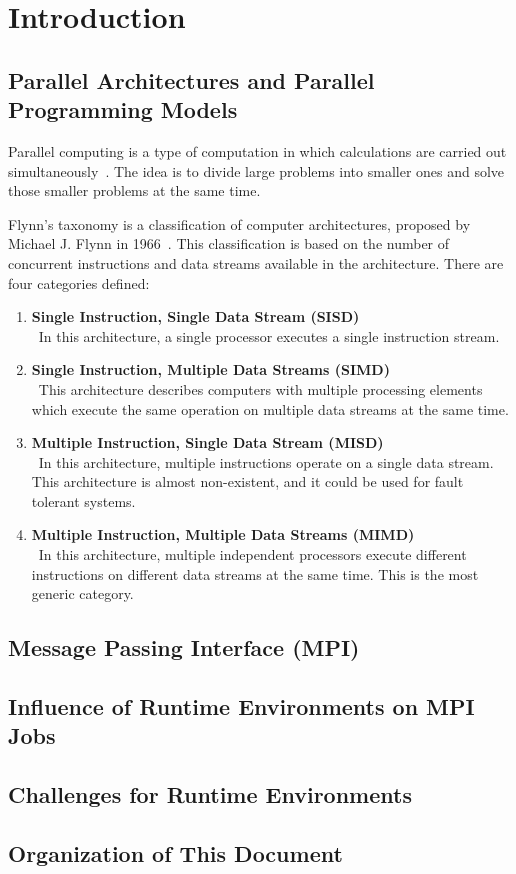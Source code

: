 \chapter{Introduction}
\label{sec:Introduction}

\section{Parallel Architectures and Parallel Programming Models}
\label{sec:Introduction}

Parallel computing is a type of computation in which calculations are carried out simultaneously~\cite{Almasi:1989:HPC:160438}. The idea is to divide large problems into smaller ones and solve those smaller problems at the same time.

Flynn's taxonomy is a classification of computer architectures, proposed by Michael J. Flynn in 1966~\cite{5009071,44900}. This classification is based on the number of concurrent instructions and data streams available in the architecture.
There are four categories defined:

\begin{enumerate}
  \item \textbf{Single Instruction, Single Data Stream (SISD)}\\\
In this architecture, a single processor executes a single instruction stream.

  \item \textbf{Single Instruction, Multiple Data Streams (SIMD)}\\\
This architecture describes computers with multiple processing elements which execute the same operation on multiple data streams at the same time.

  \item \textbf{Multiple Instruction, Single Data Stream (MISD)}\\\
In this architecture, multiple instructions operate on a single data stream. This architecture is almost non-existent, and it could be used for fault tolerant systems.

  \item \textbf{Multiple Instruction, Multiple Data Streams (MIMD)}\\\
In this architecture, multiple independent processors execute different instructions on different data streams at the same time. This is the most generic category.
\end{enumerate}



\section{Message Passing Interface (MPI)}
\label{sec:Introduction}


\section{Influence of Runtime Environments on MPI Jobs}
\label{sec:Introduction}


\section{Challenges for Runtime Environments}
\label{sec:Introduction}


\section{Organization of This Document}
\label{sec:Introduction}

